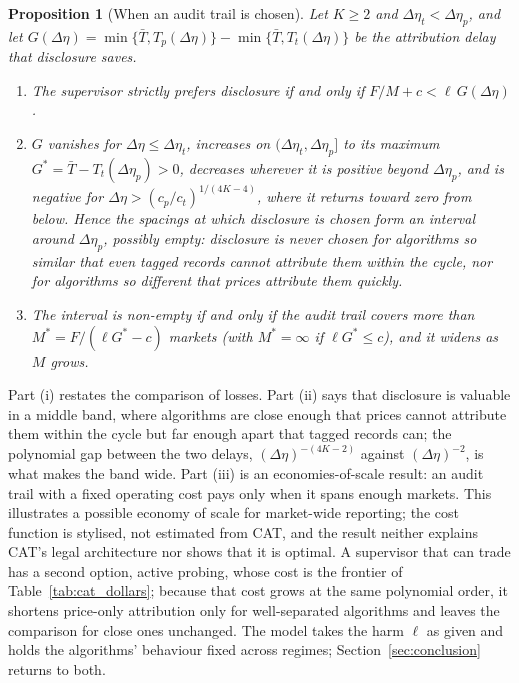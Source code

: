 \documentclass[12pt]{article}
\newtheorem{proposition}[theorem]{Proposition}
\theoremstyle{definition}
\theoremstyle{remark}
\begin{document}
\begin{proposition}[When an audit trail is chosen]\label{prop:choice}
Let $K\ge2$ and $\Delta\eta_t<\Delta\eta_p$, and let $G(\Delta\eta)=\min\{\bar T,T_p(\Delta\eta)\}-\min\{\bar T,T_t(\Delta\eta)\}$ be the attribution delay that disclosure saves.
\begin{enumerate}[label=(\roman*),itemsep=1pt]
\item The supervisor strictly prefers disclosure if and only if $F/M+c<\ell\,G(\Delta\eta)$.
\item $G$ vanishes for $\Delta\eta\le\Delta\eta_t$, increases on $(\Delta\eta_t,\Delta\eta_p]$ to its maximum $G^*=\bar T-T_t(\Delta\eta_p)>0$, decreases wherever it is positive beyond $\Delta\eta_p$, and is negative for $\Delta\eta>(c_p/c_t)^{1/(4K-4)}$, where it returns toward zero from below. Hence the spacings at which disclosure is chosen form an interval around $\Delta\eta_p$, possibly empty: disclosure is never chosen for algorithms so similar that even tagged records cannot attribute them within the cycle, nor for algorithms so different that prices attribute them quickly.
\item The interval is non-empty if and only if the audit trail covers more than $M^*=F/(\ell G^*-c)$ markets (with $M^*=\infty$ if $\ell G^*\le c$), and it widens as $M$ grows.
\end{enumerate}
\end{proposition}

Part (i) restates the comparison of losses. Part (ii) says that disclosure is valuable in a middle band, where algorithms are close enough that prices cannot attribute them within the cycle but far enough apart that tagged records can; the polynomial gap between the two delays, $(\Delta\eta)^{-(4K-2)}$ against $(\Delta\eta)^{-2}$, is what makes the band wide. Part (iii) is an economies-of-scale result: an audit trail with a fixed operating cost pays only when it spans enough markets. This illustrates a possible economy of scale for market-wide reporting; the cost function is stylised, not estimated from CAT, and the result neither explains CAT's legal architecture nor shows that it is optimal. A supervisor that can trade has a second option, active probing, whose cost is the frontier of Table~\ref{tab:cat_dollars}; because that cost grows at the same polynomial order, it shortens price-only attribution only for well-separated algorithms and leaves the comparison for close ones unchanged. The model takes the harm $\ell$ as given and holds the algorithms' behaviour fixed across regimes; Section~\ref{sec:conclusion} returns to both.
\end{document}
